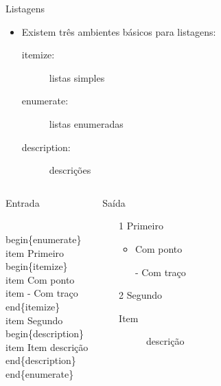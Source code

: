 \begin{frame}[fragile]{Listagens}
    \begin{itemize}
    \item Existem três ambientes básicos para listagens:
        \begin{description}
        \item[itemize:] listas simples
        \item[enumerate:] listas enumeradas
        \item[description:] descrições
        \end{description}
    \end{itemize}
    
    \begin{columns}
        \begin{block}{Entrada}
            \begin{semiverbatim}
\footnotesize{}\\begin\{enumerate\}
\\item Primeiro
  \\begin\{itemize\}
  \\item Com ponto
  \\item[-] Com traço
  \\end\{itemize\}
\\item Segundo
  \\begin\{description\}
  \\item[Item] descrição
  \\end\{description\}
\\end\{enumerate\}
\end{semiverbatim}
        \end{block}
    
        \begin{block}{Saída}
            \begin{enumerate}
            \item[1] Primeiro
            \begin{itemize}
            \item Com ponto
            \item[-] Com traço
            \end{itemize}
            \item[2] Segundo
            \begin{description}
            \item[Item] descrição
            \end{description}            
            \end{enumerate}
        \end{block}
    \end{columns}
\end{frame}

